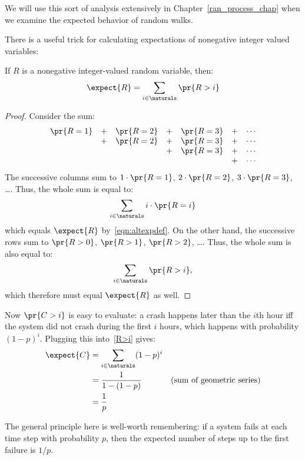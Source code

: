 \begin{editingnotes}
We will use this sort of analysis extensively in
Chapter~\ref{ran_process_chap} when we examine the expected behavior
of random walks.

There is a useful trick for
calculating expectations of nonegative integer valued variables:
\begin{lemma}
If $R$ is a nonegative integer-valued random variable, then:
%
\begin{equation}\label{R>i}
\expect{R} = \sum_{i \in \naturals} \pr{R > i}
\end{equation}
\end{lemma}

\begin{proof}
Consider the sum:
%
\[
\begin{array}{ccccccc}
\pr{R = 1} & + & \pr{R = 2} & + & \pr{R = 3} & + & \cdots \\
           & + & \pr{R = 2} & + & \pr{R = 3} & + & \cdots \\
           &   &            & + & \pr{R = 3} & + & \cdots \\
           &   &            &   &            & + & \cdots
\end{array}
\]
%
The successive columns sum to $1 \cdot \pr{R = 1}$, $2 \cdot \pr{R = 2}$,
$3 \cdot \pr{R = 3}$, \dots.  Thus, the whole sum is equal to:
%
\[
\sum_{i \in \naturals} i \cdot \pr{R = i}
\]
which equals $\expect{R}$ by~\eqref{eqn:altexpdef}.  On the other hand, the
successive rows sum to $\pr{R > 0}$, $\pr{R > 1}$, $\pr{R > 2}$, \dots.
Thus, the whole sum is also equal to:
%
\[
\sum_{i \in \naturals} \pr{R > i},
\]
%
which therefore must equal $\expect{R}$ as well.
\end{proof}

Now $\pr{C > i}$ is easy to evaluate: a crash happens later than the $i$th
hour iff the system did not crash during the first $i$ hours, which
happens with probability $(1-p)^i$.  Plugging this into~\eqref{R>i} gives:
%
\begin{align*}
\expect{C} & = \sum_{i \in \naturals} (1-p)^i \\
       & = \frac{1}{1 - (1-p)} & \text{(sum of geometric series)}\\
       & = \frac{1}{p}
\end{align*}

The general principle here is well-worth
remembering: if a system fails at each time step with probability $p$,
then the expected number of steps up to the first failure is $1 / p$.

\end{editingnotes}

